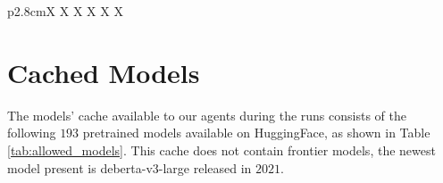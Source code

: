 \documentclass{fairmeta}
\begin{document}
\begin{table}[htbp]
\begin{NiceTabular}{p{2.8cm}X X X X X X}
\end{NiceTabular}
\caption{Summary of compute, runtime, and cost information for recent LLM-agent benchmarks.}

\end{table}





\newpage


\section{Cached Models}

\label{app:model_cache}
The models' cache available to our agents during the runs consists of the following $193$ pretrained models available on HuggingFace, as shown in Table \ref{tab:allowed_models}. This cache does not contain frontier models, the newest model present is deberta-v3-large released in $2021$.
\end{document}
